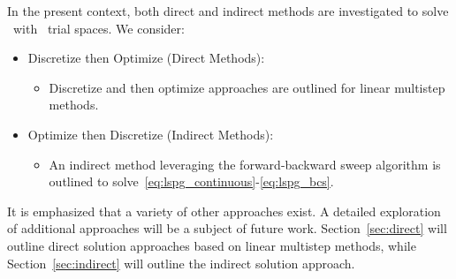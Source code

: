 In the present context, both direct and indirect methods are investigated to solve \methodAcronym\ with \spatialAcronym\ trial spaces. We consider: 

\begin{itemize} \item Discretize then Optimize (Direct Methods): 
\begin{itemize}
\item Discretize and then optimize approaches are outlined for linear multistep methods. 
\end{itemize} 
\item Optimize then Discretize (Indirect Methods): 
\begin{itemize} 
\item An indirect method leveraging the forward-backward sweep algorithm is outlined 
to solve~\eqref{eq:lspg_continuous}-\eqref{eq:lspg_bcs}. 
 \end{itemize} 
\end{itemize} 
It
is emphasized that a variety of other approaches exist. A detailed exploration
of additional approaches will be a subject of future work. Section~\ref{sec:direct} 
will outline direct solution approaches based on linear multistep methods, 
while Section~\ref{sec:indirect} will outline the indirect solution approach. 





